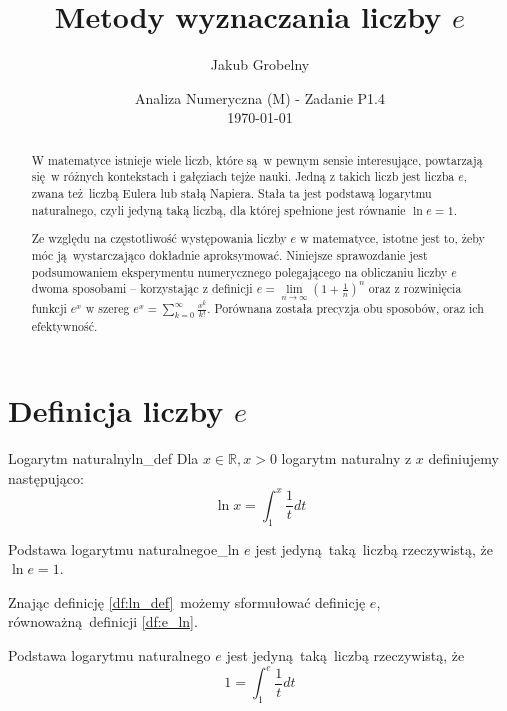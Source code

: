 \documentclass[12pt]{article}
\title{\huge Metody wyznaczania liczby $e$}
\date{Analiza Numeryczna (M) - Zadanie P1.4\\ \today}
\author{\Large Jakub Grobelny}
\begin{document}
\begin{titlepage}
\maketitle
\thispagestyle{empty}

\begin{abstract}
    W matematyce istnieje wiele liczb, które są w pewnym sensie interesujące, 
    powtarzają się w różnych kontekstach i gałęziach tejże nauki. Jedną z takich
    liczb jest liczba $e$, zwana też liczbą Eulera lub stałą Napiera. 
    Stała ta jest podstawą logarytmu naturalnego, czyli jedyną taką liczbą, dla 
    której spełnione jest równanie $\ln{e} = 1$.

    Ze względu na częstotliwość występowania liczby $e$ w matematyce, istotne jest
    to, żeby móc ją wystarczająco dokładnie aproksymować. Niniejsze sprawozdanie
    jest podsumowaniem eksperymentu numerycznego polegającego na obliczaniu liczby
    $e$ dwoma sposobami -- korzystając z definicji $e = \lim\limits_{n \to \infty}(1 + \frac{1}{n})^n$ oraz
    z rozwinięcia funkcji $e^x$ w szereg $e^x = \sum_{k=0}^\infty\frac{x^k}{k!}$.
    Porównana została precyzja obu sposobów, oraz ich efektywność.
\end{abstract}

\end{titlepage}

\newpage
\tableofcontents
\newpage

\section{Definicja liczby $e$}


\begin{defn}{Logarytm naturalny}{ln_def}
    Dla $x \in \mathds{R}, x > 0$ logarytm naturalny z $x$ definiujemy następująco:
    \large$$\ln{x} = \int_{1}^{x}\frac{1}{t} dt$$\normalsize
\end{defn}

\begin{defn}{Podstawa logarytmu naturalnego}{e_ln}
    $e$ jest jedyną taką liczbą rzeczywistą, że $\ln{e} = 1$.
\end{defn}

Znając definicję \ref{df:ln_def} możemy sformułować definicję $e$, równoważną definicji
\ref{df:e_ln}.

\begin{defn}{Podstawa logarytmu naturalnego}{}
    $e$ jest jedyną taką liczbą rzeczywistą, że 
    \large$$1 = \int_{1}^{e}\frac{1}{t} dt$$\normalsize
\end{defn}
\end{document}
